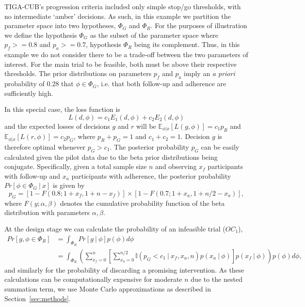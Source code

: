 \documentclass[AMA,STIX1COL]{WileyNJD-v2}
\begin{document}

TIGA-CUB's progression criteria included only simple stop/go thresholds, with no intermediate `amber' decisions. As such, in this example we partition the parameter space into two hypotheses, $\Phi_G$ and $\Phi_R$. For the purposes of illustration we define the hypothesis $\Phi_G$ as the subset of the parameter space where $p_f >= 0.8$ and $p_a >= 0.7$, hypothesis $\Phi_R$ being its complement. Thus, in this example we do not consider there to be a trade-off between the two parameters of interest. For the main trial to be feasible, both must be above their respective thresholds. The prior distributions on parameters $p_f$ and $p_a$ imply an \emph{a priori} probability of 0.28 that $\phi \in \Phi_G$, i.e. that both follow-up and adherence are sufficiently high.

In this special case, the loss function is 
$$
L(d, \phi) = c_1 E_1(d, \phi) + c_2 E_2(d, \phi)
$$
and the expected losses of decisions $g$ and $r$ will be $\mathbb{E}_{\phi | x}[L(g, \phi)] = c_1 p_R$ and $\mathbb{E}_{\phi | x}[L(r, \phi)] = c_2 p_G $, where $p_R + p_G = 1$ and $c_1 + c_2 = 1$. Decision $g$ is therefore optimal whenever $p_G > c_1$. The posterior probability $p_G$ can be easily calculated given the pilot data due to the beta prior distributions being conjugate. Specifically, given a total sample size $n$ and observing $x_f$ participants with follow-up and $x_a$ participants with adherence, the posterior probability $Pr[\phi \in \Phi_G ~|~ x]$ is given by
\begin{equation}
p_G = [1 - F(0.8; 1+x_f, 1+n-x_f)] \times [1 - F(0.7; 1+x_a, 1 + n/2 - x_a)],
\end{equation}
where $F(y; \alpha, \beta)$ denotes the cumulative probability function of the beta distribution with parameters $\alpha, \beta$.

At the design stage we can calculate the probability of an infeasible trial ($OC_1$),
\begin{align}
Pr[g, \phi \in \Phi_R] &= \int_{\Phi_R} Pr[g ~|~ \phi] p(\phi) d\phi \\
 &= \int_{\Phi_R} \left( \sum_{x_f = 0}^{n} \left[ \sum_{x_a = 0}^{n/2}  \mathbb{I}(p_G < c_1 ~|~ x_f, x_a, n) p(x_a ~|~ \phi) \right]p(x_f ~|~ \phi) \right)p(\phi) d\phi,
\end{align}
and similarly for the probability of discarding a promising intervention. As these calculations can be computationally expensive for moderate $n$ due to the nested summation term, we use Monte Carlo approximations as described in Section~\ref{sec:methods}. 
\end{document}
